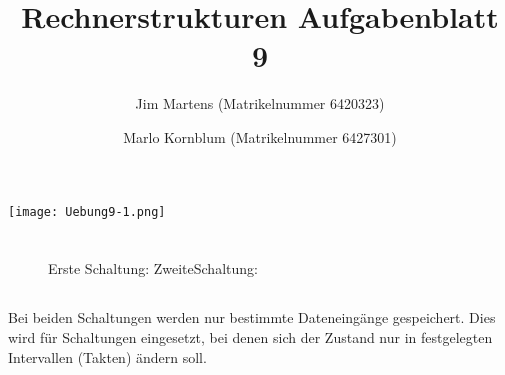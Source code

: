 \documentclass[10pt,a4paper,oneside,ngerman,numbers=noenddot]{scrartcl}
\begin{document}
\author{Jim Martens (Matrikelnummer 6420323) \and Marlo Kornblum (Matrikelnummer 6427301)}
\title{Rechnerstrukturen Aufgabenblatt 9}
\maketitle

\section{} %
\texttt{[image: Uebung9-1.png]}
\section{} %
\subsection{} %
\begin{figure}[h!]
Erste Schaltung:
\hfill
ZweiteSchaltung:

\hfill
{}
\end{figure}
\subsection{} %
Bei beiden Schaltungen werden nur bestimmte Dateneingänge gespeichert. Dies wird für Schaltungen eingesetzt, bei denen sich der Zustand nur in festgelegten Intervallen (Takten) ändern soll.
\end{document}
